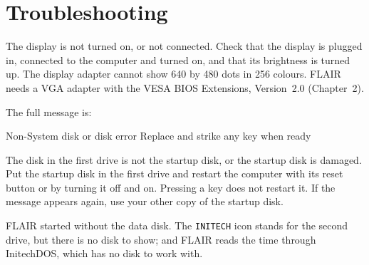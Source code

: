 \chapter{Troubleshooting}

\Cause The display is not turned on, or not connected.
\Solution Check that the display is plugged in, connected to the computer
and turned on, and that its brightness is turned up.
\Cause The display adapter cannot show 640 by 480 dots in 256 colours.
\Solution FLAIR needs a VGA adapter with the VESA BIOS Extensions,
Version~2.0 (Chapter~2).

The full message is:
\begin{TypeIn}
Non-System disk or disk error
Replace and strike any key when ready
\end{TypeIn}
\Cause The disk in the first drive is not the startup disk, or the startup
disk is damaged.
\Solution Put the startup disk in the first drive and restart the computer
with its reset button or by turning it off and on.  Pressing a key does not
restart it.  If the message appears again, use your other copy of the
startup disk.

\Cause FLAIR started without the data disk.  The \texttt{INITECH} icon
stands for the second drive, but there is no disk to show; and FLAIR reads
the time through InitechDOS, which has no disk to work with.

